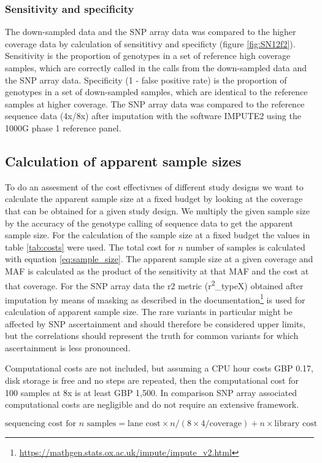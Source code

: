 \subsubsection{Sensitivity and specificity}
\label{subsec:sensspec}
The down-sampled data and the SNP array data was compared to the higher coverage data by calculation of sensititivy and specificty (figure \ref{fig:SN12f2}). Sensitivity is the proportion of genotypes in a set of reference high coverage samples, which are correctly called in the calls from the down-sampled data and the SNP array data. Specificity (1 - false positive rate) is the proportion of genotypes in a set of down-sampled samples, which are identical to the reference samples at higher coverage.
The \gls{SNP} array data was compared to the reference sequence data (4x/8x) after imputation with the software IMPUTE2 using the \gls{1000G} phase 1 reference panel.





\subsection{Calculation of apparent sample sizes}
\label{subsec:samplesize}
To do an assesment of the cost effectivnes of different study designs we want to calculate the apparent sample size at a fixed budget by looking at the coverage that can be obtained for a given study design. We multiply the given sample size by the accuracy of the genotype calling of sequence data to get the apparent sample size. For the calculation of the sample size at a fixed budget the values in table \ref{tab:costs} were used. The total cost  for $n$ number of samples is calculated with equation \ref{eq:sample_size}. The apparent sample size at a given coverage and \gls{MAF} is calculated as the product of the sensitivity at that \gls{MAF} and the cost at that coverage. For the SNP array data the \gls{r2} metric (r\textsuperscript{2}\_typeX) obtained after imputation by means of masking as described in the documentation\footnote{\url{https://mathgen.stats.ox.ac.uk/impute/impute_v2.html}} is used for calculation of apparent sample size. The rare variants in particular might be affected by SNP ascertainment and should therefore be considered upper limits, but the correlations should represent the truth for common variants for which ascertainment is less pronounced.

Computational costs are not included, but assuming a \gls{CPU} hour costs \gls{GBP} 0.17, disk storage is free and no steps are repeated, then the computational cost for 100 samples at 8x is at least \gls{GBP} 1,500. In comparison \gls{SNP} array associated computational costs are negligible and do not require an extensive framework.


\begin{equation}
\text{sequencing cost for } n \text{ samples} = \text{lane cost} \times n/(8 \times 4 / \text{coverage}) + n \times \text{library cost}
\label{eq:sample_size}
\end{equation}